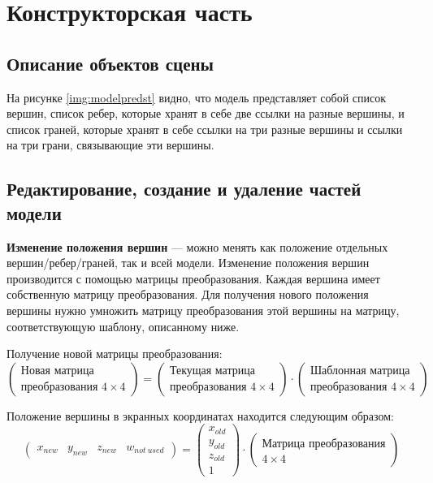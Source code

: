 \chapter{Конструкторская часть}

\section{Описание объектов сцены}

На рисунке \ref{img:modelpredst} видно, что модель представляет собой список вершин, список ребер, которые хранят в себе две ссылки на разные вершины, и список граней, которые хранят в себе ссылки на три разные вершины и ссылки на три грани, связывающие эти вершины.


\FloatBarrier

\section{Редактирование, создание и удаление частей модели}

\textbf{Изменение положения вершин} --- можно менять как положение отдельных вершин/ребер/граней, так и всей модели. Изменение положения вершин производится с помощью матрицы преобразования. Каждая вершина имеет собственную матрицу преобразования. Для получения нового положения вершины нужно умножить матрицу преобразования этой вершины на матрицу, соответствующую шаблону, описанному ниже.

Получение новой матрицы преобразования:
\begin{equation*}
	\begin{pmatrix}
		\text{Новая матрица} \\
		\text{преобразования } 4 \times 4
	\end{pmatrix}
	=
	\begin{pmatrix}
		\text{Текущая матрица} \\
		\text{преобразования } 4 \times 4
	\end{pmatrix}
	\cdot
	\begin{pmatrix}
		\text{Шаблонная матрица} \\
		\text{преобразования } 4 \times 4
	\end{pmatrix}
\end{equation*} 

Положение вершины в экранных координатах находится следующим образом:
\begin{equation*}
	\begin{pmatrix}
		x_{new} & y_{new} & z_{new} & w_{not~used}
	\end{pmatrix}
	=
	\begin{pmatrix}
		x_{old} \\
		y_{old} \\
		z_{old} \\
		1
	\end{pmatrix}
	\cdot
	\begin{pmatrix}
		\text{Матрица преобразования} \\
		4 \times 4
	\end{pmatrix}
\end{equation*} 

